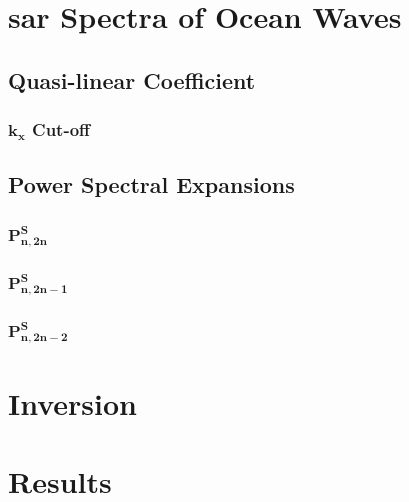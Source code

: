 \section{\acs{sar} Spectra of Ocean Waves} \label{sec:pipelineVal.sarSpectra}

\subsection{Quasi-linear Coefficient} \label{subsec:pipelineVal.sarSpectra.qlCoeff}


\subsubsection{$\mathbf{k_x}$ Cut-off} \label{subsec:pipelineVal.sarSpectra.kxCutoff}

\subsection{Power Spectral Expansions} \label{subsec:pipelineVal.sarSpectra.powerSpectra}

\subsubsection{$\mathbf{P^S_{n,2n}}$}

\subsubsection{$\mathbf{P^S_{n,2n-1}}$}

\subsubsection{$\mathbf{P^S_{n,2n-2}}$}



\section{Inversion} \label{sec:pipelineVal.inversion}



\section{Results} \label{sec:pipelineVal.results}





